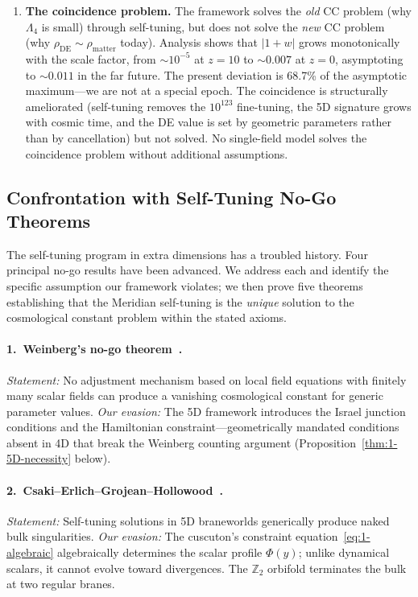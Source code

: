 \begin{enumerate}
\item \textbf{The coincidence problem.} The framework solves the \emph{old} CC problem (why $\Lambda_4$ is small) through self-tuning, but does not solve the \emph{new} CC problem (why $\rho_{\mathrm{DE}} \sim \rho_{\mathrm{matter}}$ today). Analysis shows that $|1+w|$ grows monotonically with the scale factor, from $\sim 10^{-5}$ at $z = 10$ to $\sim 0.007$ at $z = 0$, asymptoting to $\sim 0.011$ in the far future. The present deviation is 68.7\% of the asymptotic maximum---we are not at a special epoch. The coincidence is structurally ameliorated (self-tuning removes the $10^{123}$ fine-tuning, the 5D signature grows with cosmic time, and the DE value is set by geometric parameters rather than by cancellation) but not solved. No single-field model solves the coincidence problem without additional assumptions.
\end{enumerate}

\subsection{Confrontation with Self-Tuning No-Go Theorems}
\label{sec:1-nogo}

The self-tuning program in extra dimensions has a troubled history. Four principal no-go results have been advanced. We address each and identify the specific assumption our framework violates; we then prove five theorems establishing that the Meridian self-tuning is the \emph{unique} solution to the cosmological constant problem within the stated axioms.

\paragraph{1.\ Weinberg's no-go theorem~\cite{ch1:weinberg89}.}
\emph{Statement:} No adjustment mechanism based on local field equations with finitely many scalar fields can produce a vanishing cosmological constant for generic parameter values. \emph{Our evasion:} The 5D framework introduces the Israel junction conditions and the Hamiltonian constraint---geometrically mandated conditions absent in 4D that break the Weinberg counting argument (Proposition~\ref{thm:1-5D-necessity} below).

\paragraph{2.\ Csaki--Erlich--Grojean--Hollowood~\cite{ch1:csaki00}.}
\emph{Statement:} Self-tuning solutions in 5D braneworlds generically produce naked bulk singularities. \emph{Our evasion:} The cuscuton's constraint equation~\eqref{eq:1-algebraic} algebraically determines the scalar profile $\Phi(y)$; unlike dynamical scalars, it cannot evolve toward divergences. The $\mathbb{Z}_2$ orbifold terminates the bulk at two regular branes.

